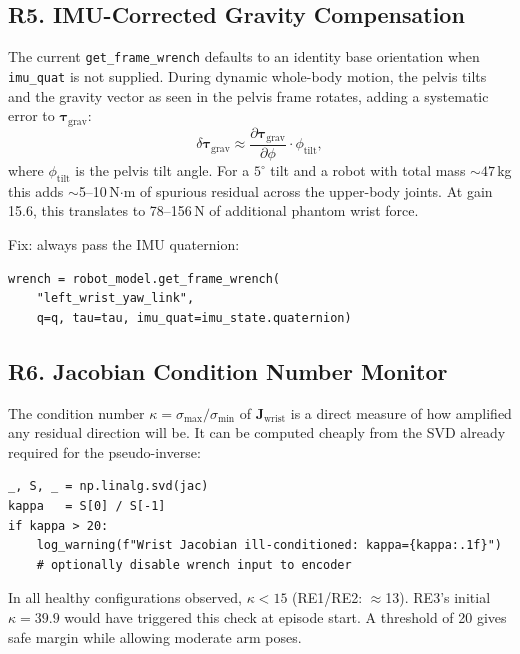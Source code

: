 \documentclass[11pt,a4paper]{article}
\newcommand{\bJ}{\bm{J}}
\newcommand{\btau}{\bm{\tau}}
\begin{document}
\subsection{R5. IMU-Corrected Gravity Compensation}
\label{sec:rec_imu}

The current \texttt{get\_frame\_wrench} defaults to an identity base
orientation when \texttt{imu\_quat} is not supplied.  During dynamic
whole-body motion, the pelvis tilts and the gravity vector as seen in the
pelvis frame rotates, adding a systematic error to $\btau_\text{grav}$:
\begin{equation}
  \delta\btau_\text{grav} \approx \frac{\partial \btau_\text{grav}}{\partial\phi}
  \cdot \phi_\text{tilt},
\end{equation}
where $\phi_\text{tilt}$ is the pelvis tilt angle.  For a $5^\circ$ tilt
and a robot with total mass $\sim 47$\,kg this adds $\sim$5--10\,N$\cdot$m
of spurious residual across the upper-body joints.  At gain 15.6, this
translates to 78--156\,N of additional phantom wrist force.

Fix: always pass the IMU quaternion:
\begin{lstlisting}
wrench = robot_model.get_frame_wrench(
    "left_wrist_yaw_link",
    q=q, tau=tau, imu_quat=imu_state.quaternion)
\end{lstlisting}

\subsection{R6. Jacobian Condition Number Monitor}
\label{sec:rec_condnum}

The condition number $\kappa = \sigma_\text{max}/\sigma_\text{min}$ of
$\bJ_\text{wrist}$ is a direct measure of how amplified any residual
direction will be.  It can be computed cheaply from the SVD already required
for the pseudo-inverse:
\begin{lstlisting}
_, S, _ = np.linalg.svd(jac)
kappa   = S[0] / S[-1]
if kappa > 20:
    log_warning(f"Wrist Jacobian ill-conditioned: kappa={kappa:.1f}")
    # optionally disable wrench input to encoder
\end{lstlisting}
In all healthy configurations observed, $\kappa < 15$ (RE1/RE2: $\approx$13).
RE3's initial $\kappa = 39.9$ would have triggered this check at episode
start.  A threshold of 20 gives safe margin while allowing moderate arm
poses.
\end{document}

